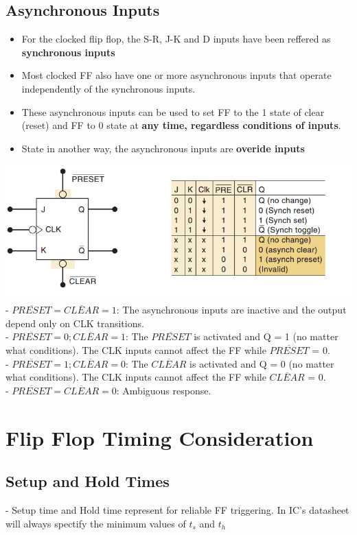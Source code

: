 \documentclass[12pt]{article}
\begin{document}
\subsection{Asynchronous Inputs}
\begin{itemize}
	\item For the clocked flip flop, the S-R, J-K and D inputs have been reffered as \textbf{synchronous inputs}
	\item Most clocked FF also have one or more asynchronous inputs that operate independently of the synchronous inputs.
	\item These asynchronous inputs can be used to set FF to the 1 state of clear (reset) and FF to 0 state at \textbf{any time, regardless conditions of inputs}.
	\item State in another way, the asynchronous inputs are \textbf{overide inputs}
\end{itemize}
\includegraphics[scale = 0.65]{hinh15.png}
\bigbreak
- $\overline{PRESET} = \overline{CLEAR} = 1$: The asynchronous inputs are inactive and the output depend only on CLK transitions. \\
- $\overline{PRESET} = 0; \overline{CLEAR} = 1$: The $\overline{PRESET}$ is activated and Q = 1 (no matter what conditions). The CLK inputs cannot affect the FF while $\overline{PRESET}$ = 0. \\
- $\overline{PRESET} = 1; \overline{CLEAR} = 0$: The $\overline{CLEAR}$ is activated and Q = 0 (no matter what conditions). The CLK inputs cannot affect the FF while $\overline{CLEAR}$ = 0. \\
- $\overline{PRESET} = \overline{CLEAR} = 0$: Ambiguous response. \\
\section{Flip Flop Timing Consideration}
\subsection{Setup and Hold Times}
- Setup time and Hold time represent for reliable FF triggering. In IC's datasheet will always spectify the minimum values of $t_s$ and $t_h$
\end{document}
